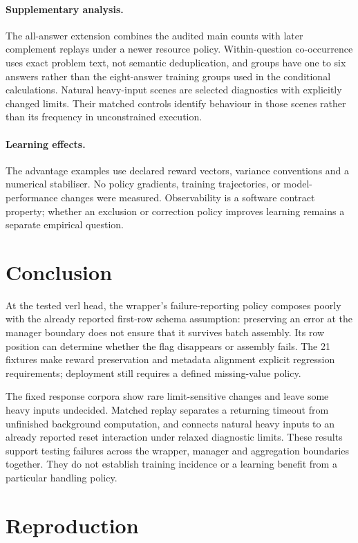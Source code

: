 \documentclass[10pt,a4paper]{article}
\begin{document}
\paragraph{Supplementary analysis.}
The all-answer extension combines the audited main counts with later
complement replays under a newer resource policy. Within-question
co-occurrence uses exact problem text, not semantic deduplication, and
groups have one to six answers rather than the eight-answer training
groups used in the conditional calculations. Natural heavy-input scenes
are selected diagnostics with explicitly changed limits. Their matched
controls identify behaviour in those scenes rather than its frequency
in unconstrained execution.

\paragraph{Learning effects.}
The advantage examples use declared reward vectors, variance conventions
and a numerical stabiliser. No policy gradients, training trajectories,
or model-performance changes were measured. Observability is a software
contract property; whether an exclusion or correction policy improves
learning remains a separate empirical question.

\section{Conclusion}

At the tested verl head, the wrapper's failure-reporting policy composes
poorly with the already reported first-row schema assumption: preserving
an error at the manager boundary does not ensure that it survives batch
assembly. Its row position can determine whether the flag disappears or
assembly fails. The 21 fixtures make reward preservation and metadata
alignment explicit regression requirements; deployment still requires a
defined missing-value policy.

The fixed response corpora show rare limit-sensitive changes and leave
some heavy inputs undecided. Matched replay separates a returning timeout
from unfinished background computation, and connects natural heavy inputs
to an already reported reset interaction under relaxed diagnostic limits.
These results support testing failures across the wrapper, manager and
aggregation boundaries together. They do not establish training incidence
or a learning benefit from a particular handling policy.

\appendix
\section{Reproduction}
\end{document}
